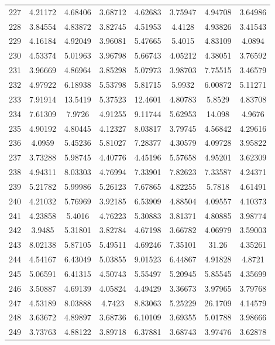 \begin{center}
\begin{longtable}{cccccccc}
227 & 4.21172 & 4.68406 & 3.68712 & 4.62683 & 3.75947 & 4.94708 & 3.64986\\
228 & 3.84554 & 4.83872 & 3.82745 & 4.51953 & 4.4128 & 4.93826 & 3.41543\\
229 & 4.16184 & 4.92049 & 3.96081 & 5.47665 & 5.4015 & 4.83109 & 4.0894\\
230 & 4.53374 & 5.01963 & 3.96798 & 5.66743 & 4.05212 & 4.38051 & 3.76592\\
231 & 3.96669 & 4.86964 & 3.85298 & 5.07973 & 3.98703 & 7.75515 & 3.46579\\
232 & 4.97922 & 6.18938 & 5.53798 & 5.81715 & 5.9932 & 6.00872 & 5.11271\\
233 & 7.91914 & 13.5419 & 5.37523 & 12.4601 & 4.80783 & 5.8529 & 4.83708\\
234 & 7.61309 & 7.9726 & 4.91255 & 9.11744 & 5.62953 & 14.098 & 4.9676\\
235 & 4.90192 & 4.80445 & 4.12327 & 8.03817 & 3.79745 & 4.56842 & 4.29616\\
236 & 4.0959 & 5.45236 & 5.81027 & 7.28377 & 4.30579 & 4.09728 & 3.95822\\
237 & 3.73288 & 5.98745 & 4.40776 & 4.45196 & 5.57658 & 4.95201 & 3.62309\\
238 & 4.94311 & 8.03303 & 4.76994 & 7.33901 & 7.82623 & 7.33587 & 4.24371\\
239 & 5.21782 & 5.99986 & 5.26123 & 7.67865 & 4.82255 & 5.7818 & 4.61491\\
240 & 4.21032 & 5.76969 & 3.92185 & 6.53909 & 4.88504 & 4.09557 & 4.10373\\
241 & 4.23858 & 5.4016 & 4.76223 & 5.30883 & 3.81371 & 4.80885 & 3.98774\\
242 & 3.9485 & 5.31801 & 3.82784 & 4.67198 & 3.66782 & 4.06979 & 3.59003\\
243 & 8.02138 & 5.87105 & 5.49511 & 4.69246 & 7.35101 & 31.26 & 4.35261\\
244 & 4.54167 & 6.43049 & 5.03855 & 9.01523 & 6.44867 & 4.91828 & 4.8721\\
245 & 5.06591 & 6.41315 & 4.50743 & 5.55497 & 5.20945 & 5.85545 & 4.35699\\
246 & 3.50887 & 4.69139 & 4.05824 & 4.49429 & 3.36673 & 3.97965 & 3.79768\\
247 & 4.53189 & 8.03888 & 4.7423 & 8.83063 & 5.25229 & 26.1709 & 4.14579\\
248 & 3.63672 & 4.89897 & 3.68736 & 6.10109 & 3.69355 & 5.01788 & 3.98666\\
249 & 3.73763 & 4.88122 & 3.89718 & 6.37881 & 3.68743 & 3.97476 & 3.62878\\

\end{longtable}
\end{center}
